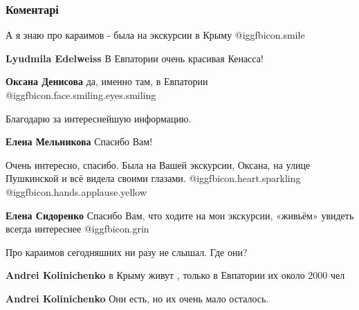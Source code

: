  
 
 
 
 
\subsubsection{Коментарі}

\begin{itemize} %
А я знаю про караимов - была на экскурсии в Крыму  @igg{fbicon.smile} 

\begin{itemize} %
\textbf{Lyudmila Edelweiss} В Евпатории очень красивая Кенасса!

\textbf{Оксана Денисова} да, именно там, в Евпатории  @igg{fbicon.face.smiling.eyes.smiling} 
\end{itemize} %

Благодарю за интереснейшую информацию.

\begin{itemize} %
\textbf{Елена Мельникова} Спасибо Вам!
\end{itemize} %


Очень интересно, спасибо. Была на Вашей экскурсии, Оксана, на улице Пушкинской и
всё видела своими глазами. @igg{fbicon.heart.sparkling}  @igg{fbicon.hands.applause.yellow} 

\begin{itemize} %
\textbf{Елена Сидоренко} Спасибо Вам, что ходите на мои экскурсии, «живьём» увидеть всегда интереснее @igg{fbicon.grin} 
\end{itemize} %

Про караимов сегодняшних ни разу не слышал. Где они?

\begin{itemize} %
\textbf{Andrei Kolinichenko} в Крыму живут , только в Евпатории их около 2000 чел

\textbf{Andrei Kolinichenko} Они есть, но их очень мало осталось.


\end{itemize}
\end{itemize}
